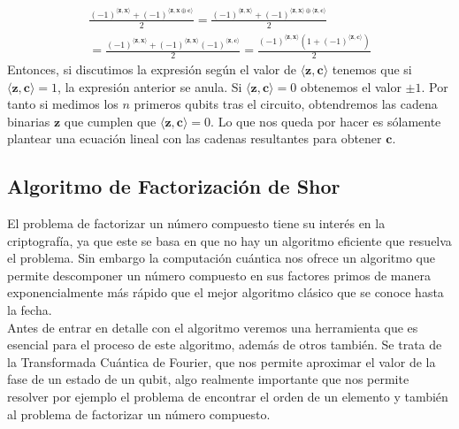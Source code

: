 \documentclass[a4paper]{article}
\numberwithin{equation}{section}
\begin{document}
\begin{equation}
\begin{split}
\frac{(-1)^{\langle\mathbf{z}, \mathbf{x}\rangle} + (-1)^{\langle\mathbf{z}, \mathbf{x}\oplus\mathbf{c}\rangle}}{2}
= 
\frac{(-1)^{\langle\mathbf{z}, \mathbf{x}\rangle} + (-1)^{\langle\mathbf{z}, \mathbf{x}\rangle \oplus \langle \mathbf{z}, \mathbf{c}\rangle}}{2}
\\=
\frac{(-1)^{\langle\mathbf{z}, \mathbf{x}\rangle} + (-1)^{\langle\mathbf{z}, \mathbf{x}\rangle}(-1)^{ \langle \mathbf{z}, \mathbf{c}\rangle}}{2}
=
\frac{(-1)^{\langle\mathbf{z}, \mathbf{x}\rangle} (1 + (-1)^{ \langle \mathbf{z}, \mathbf{c}\rangle})}{2}
\end{split}
\end{equation}
Entonces, si discutimos la expresión según el valor de $\langle \mathbf{z}, \mathbf{c} \rangle$ tenemos que si $\langle \mathbf{z}, \mathbf{c} \rangle = 1$, la expresión anterior se anula. Si $\langle \mathbf{z}, \mathbf{c} \rangle = 0$ obtenemos el valor $\pm 1$. Por tanto si medimos los $n$ primeros qubits tras el circuito, obtendremos las cadena binarias $\mathbf{z}$ que cumplen que $\langle \mathbf{z}, \mathbf{c} \rangle = 0$. Lo que nos queda por hacer es sólamente plantear una ecuación lineal con las cadenas resultantes para obtener $\mathbf{c}$.

\newpage

\subsection{Algoritmo de Factorización de Shor}
El problema de factorizar un número compuesto tiene su interés en la criptografía, ya que este se basa en que no hay un algoritmo eficiente que resuelva el problema. Sin embargo la computación cuántica nos ofrece un algoritmo que permite descomponer un número compuesto en sus factores primos de manera exponencialmente más rápido que el mejor algoritmo clásico que se conoce hasta la fecha.\\
\linebreak
Antes de entrar en detalle con el algoritmo veremos una herramienta que es esencial para el proceso de este algoritmo, además de otros también. Se trata de la Transformada Cuántica de Fourier, que nos permite aproximar el valor de la fase de un estado de un qubit, algo realmente importante que nos permite resolver por ejemplo el problema de encontrar el orden de un elemento y también al problema de factorizar un número compuesto.\\
\end{document}

